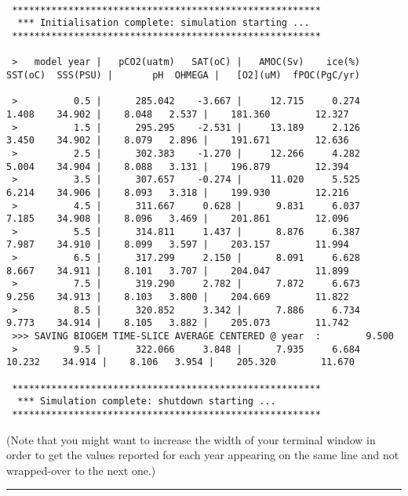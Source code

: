 \vspace{-2mm}\tiny\begin{verbatim}

 *******************************************************
  *** Initialisation complete: simulation starting ...
 *******************************************************

 >   model year |   pCO2(uatm)   SAT(oC) |   AMOC(Sv)    ice(%)   SST(oC)  SSS(PSU) |       pH  OHMEGA |   [O2](uM)  fPOC(PgC/yr)

 >          0.5 |      285.042    -3.667 |     12.715     0.274     1.408    34.902 |    8.048   2.537 |    181.360        12.327
 >          1.5 |      295.295    -2.531 |     13.189     2.126     3.450    34.902 |    8.079   2.896 |    191.671        12.636
 >          2.5 |      302.383    -1.270 |     12.266     4.282     5.004    34.904 |    8.088   3.131 |    196.879        12.394
 >          3.5 |      307.657    -0.274 |     11.020     5.525     6.214    34.906 |    8.093   3.318 |    199.930        12.216
 >          4.5 |      311.667     0.628 |      9.831     6.037     7.185    34.908 |    8.096   3.469 |    201.861        12.096
 >          5.5 |      314.811     1.437 |      8.876     6.387     7.987    34.910 |    8.099   3.597 |    203.157        11.994
 >          6.5 |      317.299     2.150 |      8.091     6.628     8.667    34.911 |    8.101   3.707 |    204.047        11.899
 >          7.5 |      319.290     2.782 |      7.872     6.673     9.256    34.913 |    8.103   3.800 |    204.669        11.822
 >          8.5 |      320.852     3.342 |      7.886     6.734     9.773    34.914 |    8.105   3.882 |    205.073        11.742
 >>> SAVING BIOGEM TIME-SLICE AVERAGE CENTERED @ year  :        9.500
 >          9.5 |      322.066     3.848 |      7.935     6.684    10.232    34.914 |    8.106   3.954 |    205.320        11.670

 *******************************************************
  *** Simulation complete: shutdown starting ...
 *******************************************************

\end{verbatim}\normalsize\vspace{-2mm}

(Note that you might want to increase the width of your terminal window in order to get the values reported for each year appearing on the same line and not wrapped-over to the next one.)

\vspace{1mm}\noindent\rule{4cm}{0.5pt}\vspace{2mm}

